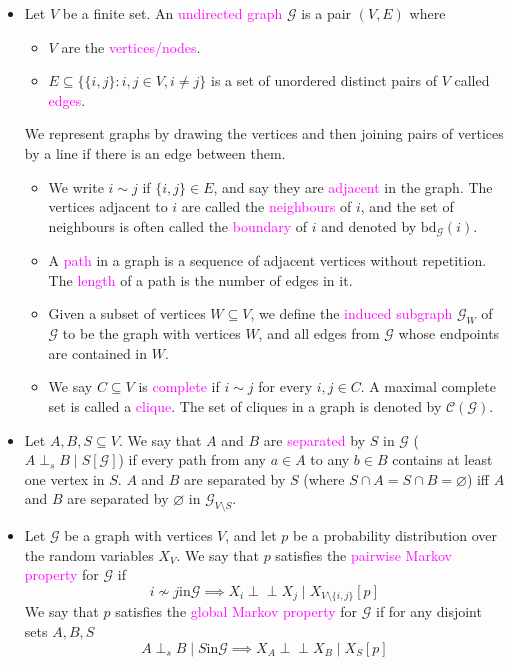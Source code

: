 \documentclass[UTF8]{book}
\newcommand{\perpp}{\ensuremath{\perp\!\!\!\!\perp}}
\newcommand{\concept}[1]{\textcolor{magenta}{#1}}
\begin{document}
\begin{itemize}
\item Let $V$ be a finite set. An \concept{undirected graph} $\mathcal{G}$ is a pair $(V,E)$ where
\begin{itemize}
	\item $V$ are the \concept{vertices/nodes}.
	\item $E\subseteq\{\{i,j\}: i,j\in V, i\neq j\}$ is a set of unordered distinct pairs of $V$ called \concept{edges}.
\end{itemize}
We represent graphs by drawing the vertices and then joining pairs of vertices by a line if there is an edge between them.
\begin{itemize}
	\item We write $i\sim j$ if $\{i,j\}\in E$, and say they are \concept{adjacent} in the graph. The vertices adjacent to $i$ are called the \concept{neighbours} of $i$, and the set of neighbours is often called the \concept{boundary} of $i$ and denoted by $\mathrm{bd}_{\mathcal{G}}(i)$.
	\item A \concept{path} in a graph is a sequence of adjacent vertices without repetition. The \concept{length} of a path is the number of edges in it.
	\item Given a subset of vertices $W\subseteq V$, we define the \concept{induced subgraph} $\mathcal{G}_W$ of $\mathcal{G}$ to be the graph with vertices $W$, and all edges from $\mathcal{G}$ whose endpoints are contained in $W$.
	\item We say $C\subseteq V$ is \concept{complete} if $i\sim j$ for every $i,j\in C$. A maximal complete set is called a \concept{clique}. The set of cliques in a graph is denoted by $\mathcal{C}(\mathcal{G})$.
\end{itemize}
\item Let $A,B,S\subseteq V$. We say that $A$ and $B$ are \concept{separated} by $S$ in $\mathcal{G}$ ($A\perp_s B\mid S[\mathcal{G}]$) if every path from any $a\in A$ to any $b\in B$ contains at least one vertex in $S$. $A$ and $B$ are separated by $S$ (where $S\cap A=S\cap B=\varnothing$) iff $A$ and $B$ are separated by $\varnothing$ in $\mathcal{G}_{V\setminus S}$.
\item Let $\mathcal{G}$ be a graph with vertices $V$, and let $p$ be a probability distribution over the random variables $X_V$. We say that $p$ satisfies the \concept{pairwise Markov property} for $\mathcal{G}$ if
$$
i\not\sim j \mathrm{in} \mathcal{G} \implies X_i\perpp X_j\mid X_{V\setminus\{i,j\}}[p]
$$
We say that $p$ satisfies the \concept{global Markov property} for $\mathcal{G}$ if for any disjoint sets $A,B,S$
$$
A\perp_s B\mid S \mathrm{in} \mathcal{G} \implies X_A\perpp X_B\mid X_S[p]
$$
\end{itemize}
\end{document}
